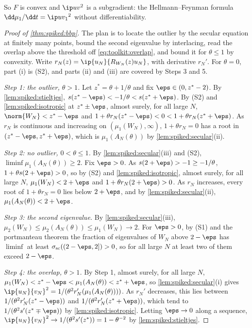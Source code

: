 \begin{refsection}
So $F$ is convex and $\ip uv^2$ is a subgradient: the Hellmann--Feynman formula $\dd\mu_1/\dd t=\ip u{v_1}^2$ without differentiability.

\begin{proof}[Proof of \cref{thm:spiked:bbp}]
The plan is to locate the outlier by the secular equation at finitely many points, bound the second eigenvalue by interlacing, read the overlap above the threshold off \eqref{eq:toolkit:overlap}, and bound it for $\theta\le1$ by convexity. Write $r_N(z)=\ip{u_N}{R_{W_N}(z)u_N}$, with derivative $r_N'$. For $\theta=0$, part (i) is (S2), and parts (ii) and (iii) are covered by Steps 3 and 5.

\emph{Step 1: the outlier, $\theta>1$.} Let $z^*=\theta+1/\theta$ and fix $\eps\in(0,z^*-2)$. By \cref{lem:spiked:stieltjes}, $s(z^*-\eps)<-1/\theta<s(z^*+\eps)$. By (S2) and \cref{lem:spiked:isotropic} at $z^*\pm\eps$, almost surely, for all large $N$, $\norm{W_N}<z^*-\eps$ and $1+\theta r_N(z^*-\eps)<0<1+\theta r_N(z^*+\eps)$. As $r_N$ is continuous and increasing on $(\mu_1(W_N),\infty)$, $1+\theta r_N=0$ has a root in $(z^*-\eps,z^*+\eps)$, which is $\mu_1(A_N(\theta))$ by \cref{lem:spiked:secular}(ii).

\emph{Step 2: no outlier, $0<\theta\le1$.} By \cref{lem:spiked:secular}(iii) and (S2), $\liminf\mu_1(A_N(\theta))\ge2$. Fix $\eps>0$. As $s(2+\eps)>-1\ge-1/\theta$, $1+\theta s(2+\eps)>0$, so by (S2) and \cref{lem:spiked:isotropic}, almost surely, for all large $N$, $\mu_1(W_N)<2+\eps$ and $1+\theta r_N(2+\eps)>0$. As $r_N$ increases, every root of $1+\theta r_N=0$ lies below $2+\eps$, and by \cref{lem:spiked:secular}(ii), $\mu_1(A_N(\theta))<2+\eps$.

\emph{Step 3: the second eigenvalue.} By \cref{lem:spiked:secular}(iii), $\mu_2(W_N)\le\mu_2(A_N(\theta))\le\mu_1(W_N)\to2$. For $\eps>0$, by (S1) and the portmanteau theorem the fraction of eigenvalues of $W_N$ above $2-\eps$ has $\liminf$ at least $\spikedsc((2-\eps,2])>0$, so for all large $N$ at least two of them exceed $2-\eps$.

\emph{Step 4: the overlap, $\theta>1$.} By Step 1, almost surely, for all large $N$, $\mu_1(W_N)<z^*-\eps<\mu_1(A_N(\theta))<z^*+\eps$, so \cref{lem:spiked:secular}(i) gives $\ip{u_N}{v_N}^2=1/(\theta^2r_N'(\mu_1(A_N(\theta))))$. As $r_N'$ decreases, this lies between $1/(\theta^2r_N'(z^*-\eps))$ and $1/(\theta^2r_N'(z^*+\eps))$, which tend to $1/(\theta^2s'(z^*\mp\eps))$ by \cref{lem:spiked:isotropic}. Letting $\eps\to0$ along a sequence, $\ip{u_N}{v_N}^2\to1/(\theta^2s'(z^*))=1-\theta^{-2}$ by \cref{lem:spiked:stieltjes}.


\end{proof}
\end{refsection}
